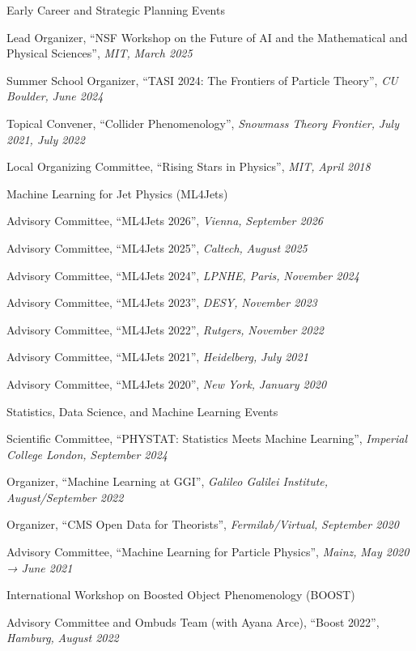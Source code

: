 \item Early Career and Strategic Planning Events
\bsbl 
\item Lead Organizer, ``NSF Workshop on the Future of AI and the Mathematical and Physical Sciences'', \emph{MIT, }\emph{March 2025}
\item Summer School Organizer, ``TASI 2024: The Frontiers of Particle Theory'', \emph{CU Boulder, }\emph{June 2024}
\item Topical Convener, ``Collider Phenomenology'', \emph{Snowmass Theory Frontier, }\emph{July 2021, July 2022}
\item Local Organizing Committee, ``Rising Stars in Physics'', \emph{MIT, }\emph{April 2018}
\el 
\item Machine Learning for Jet Physics (ML4Jets)
\bsbl 
\item Advisory Committee, ``ML4Jets 2026'', \emph{Vienna, }\emph{September 2026}
\item Advisory Committee, ``ML4Jets 2025'', \emph{Caltech, }\emph{August 2025}
\item Advisory Committee, ``ML4Jets 2024'', \emph{LPNHE, Paris, }\emph{November 2024}
\item Advisory Committee, ``ML4Jets 2023'', \emph{DESY, }\emph{November 2023}
\item Advisory Committee, ``ML4Jets 2022'', \emph{Rutgers, }\emph{November 2022}
\item Advisory Committee, ``ML4Jets 2021'', \emph{Heidelberg, }\emph{July 2021}
\item Advisory Committee, ``ML4Jets 2020'', \emph{New York, }\emph{January 2020}
\el 
\item Statistics, Data Science, and Machine Learning Events
\bsbl 
\item Scientific Committee, ``PHYSTAT: Statistics Meets Machine Learning'', \emph{Imperial College London, }\emph{September 2024}
\item Organizer, ``Machine Learning at GGI'', \emph{Galileo Galilei Institute, }\emph{August/September 2022}
\item Organizer, ``CMS Open Data for Theorists'', \emph{Fermilab/Virtual, }\emph{September 2020}
\item Advisory Committee, ``Machine Learning for Particle Physics'', \emph{Mainz, }\emph{May 2020 → June 2021}
\el 
\item International Workshop on Boosted Object Phenomenology (BOOST)
\bsbl 
\item Advisory Committee and Ombuds Team (with Ayana Arce), ``Boost 2022'', \emph{Hamburg, }\emph{August 2022}
